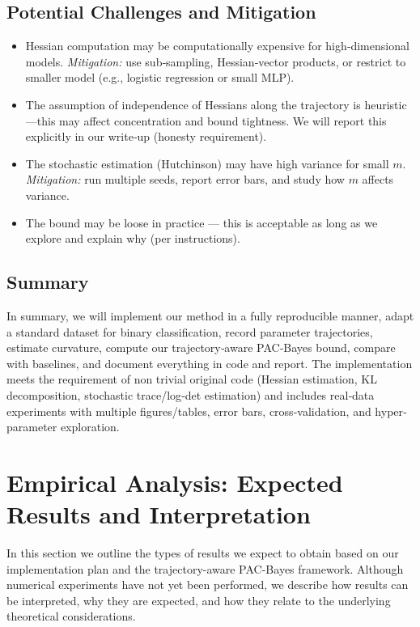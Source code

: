 \subsection{Potential Challenges and Mitigation}

\begin{itemize}[noitemsep]
  \item Hessian computation may be computationally expensive for high‑dimensional models. \emph{Mitigation:} use sub‑sampling, Hessian‐vector products, or restrict to smaller model (e.g., logistic regression or small MLP).  
  \item The assumption of independence of Hessians along the trajectory is heuristic—this may affect concentration and bound tightness. We will report this explicitly in our write‑up (honesty requirement).  
  \item The stochastic estimation (Hutchinson) may have high variance for small \(m\). \emph{Mitigation:} run multiple seeds, report error bars, and study how \(m\) affects variance.  
  \item The bound may be loose in practice — this is acceptable as long as we explore and explain why (per instructions).  
\end{itemize}

\subsection{Summary}

In summary, we will implement our method in a fully reproducible manner, adapt a standard dataset for binary classification, record parameter trajectories, estimate curvature, compute our trajectory‐aware PAC‑Bayes bound, compare with baselines, and document everything in code and report. The implementation meets the requirement of non trivial original code (Hessian estimation, KL decomposition, stochastic trace/log‑det estimation) and includes real‐data experiments with multiple figures/tables, error bars, cross‐validation, and hyper‐parameter exploration.

\section{Empirical Analysis: Expected Results and Interpretation}

In this section we outline the types of results we expect to obtain based on our implementation plan and the trajectory-aware PAC-Bayes framework. Although numerical experiments have not yet been performed, we describe how results can be interpreted, why they are expected, and how they relate to the underlying theoretical considerations.

